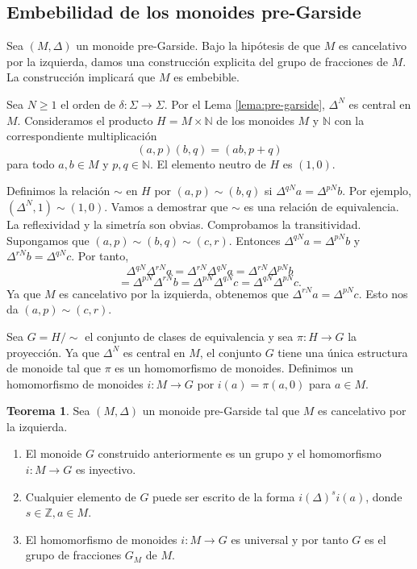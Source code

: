 \documentclass[12pt]{book}
\theoremstyle{definition}
\newtheorem{teor}{Teorema}[section]
\begin{document}
\subsection{Embebilidad de los monoides pre-Garside}

Sea $(M,\Delta)$ un monoide pre-Garside. Bajo la hipótesis de que $M$ es cancelativo por la izquierda, damos una construcción explicita del grupo de fracciones de $M$. La construcción implicará que $M$ es embebible.

Sea $N\geq 1$ el orden de $\delta:\Sigma\rightarrow\Sigma$. Por el Lema \ref{lema:pre-garside}, $\Delta^N$ es central en $M$. Consideramos el producto $H=M\times\mathbb{N}$ de los monoides $M$ y $\mathbb{N}$ con la correspondiente multiplicación
$$(a,p)(b,q)=(ab,p+q)$$
para todo $a,b\in M$ y $p,q\in\mathbb{N}$. El elemento neutro de $H$ es $(1,0)$.

Definimos la relación $\sim$ en $H$ por $(a,p)\sim(b,q)$ si $\Delta^{qN}a=\Delta^{pN}b$. Por ejemplo, $(\Delta^{N},1)\sim(1,0)$. Vamos a demostrar que $\sim$ es una relación de equivalencia. La reflexividad y la simetría son obvias. Comprobamos la transitividad. Supongamos que $(a,p)\sim(b,q)\sim(c,r)$. Entonces $\Delta^{qN}a=\Delta^{pN}b$ y $\Delta^{rN}b=\Delta^{qN}c$. Por tanto,
$$\Delta^{qN}\Delta^{rN}a=\Delta^{rN}\Delta^{qN}a=\Delta^{rN}\Delta^{pN}b$$
$$=\Delta^{pN}\Delta^{rN}b=\Delta^{pN}\Delta^{qN}c=\Delta^{qN}\Delta^{pN}c.$$
Ya que $M$ es cancelativo por la izquierda, obtenemos que $\Delta^{rN}a=\Delta^{pN}c$. Esto nos da $(a,p)\sim(c,r)$.

Sea $G=H/\sim$ el conjunto de clases de equivalencia y sea $\pi:H\rightarrow G$ la proyección. Ya que $\Delta^N$ es central en $M$, el conjunto $G$ tiene una única estructura de monoide tal que $\pi$ es un homomorfismo de monoides. Definimos un homomorfismo de monoides $i:M\rightarrow G$ por $i(a)=\pi(a,0)$ para $a\in M$.

\begin{teor}
Sea $(M,\Delta)$ un monoide pre-Garside tal que $M$ es cancelativo por la izquierda.
\begin{enumerate}[label=(\roman*)]
\item El monoide $G$ construido anteriormente es un grupo y el homomorfismo $i:M\rightarrow G$ es inyectivo.
\item Cualquier elemento de $G$ puede ser escrito de la forma $i(\Delta)^si(a)$, donde $s\in\mathbb{Z}, a\in M$.
\item El homomorfismo de monoides $i:M\rightarrow G$ es universal y por tanto $G$ es el grupo de fracciones $G_M$ de $M$.
\end{enumerate}
\label{teor:pre-garside}
\end{teor}
\end{document}
